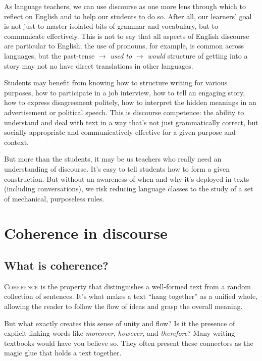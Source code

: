 As language teachers, we can use discourse as one more lens through which to reflect on English and to help our students to do so. After all, our learners' goal is not just to master isolated bits of grammar and vocabulary, but to communicate effectively. This is not to say that all aspects of English discourse are particular to English; the use of pronouns, for example, is common across languages, but the past-tense $\rightarrow$ \textit{used to} $\rightarrow$ \textit{would} structure of getting into a story may not no have direct translations in other languages.

Students may benefit from knowing how to structure writing for various purposes, how to participate in a job interview, how to tell an engaging story, how to express disagreement politely, how to interpret the hidden meanings in an advertisement or political speech. This is discourse competence: the ability to understand and deal with text in a way that's not just grammatically correct, but socially appropriate and communicatively effective for a given purpose and context.

But more than the students, it may be us teachers who really need an understanding of discourse. It's easy to tell students how to form a given construction. But without an awareness of when and why it's deployed in texts (including conversations), we risk reducing language classes to the study of a set of mechanical, purposeless rules.

\section{Coherence in discourse}

\subsection{What is coherence?}

\textsc{Coherence} is the property that distinguishes a well-formed text from a random collection of sentences. It's what makes a text ``hang together'' as a unified whole, allowing the reader to follow the flow of ideas and grasp the overall meaning. 

But what exactly creates this sense of unity and flow? Is it the presence of explicit linking words like \textit{moreover}, \textit{however}, and \textit{therefore}? Many writing textbooks would have you believe so. They often present these connectors as the magic glue that holds a text together.

